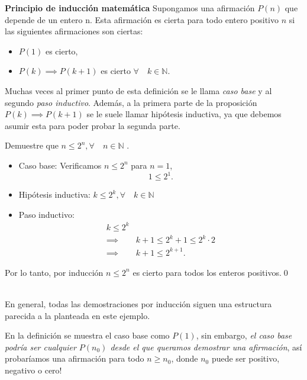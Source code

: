 \documentclass[12pt]{book}
\begin{document}
\begin{axiomenv}
    \textbf{Principio de inducción matemática}
    Supongamos una afirmación $P(n)$ que depende de un entero n. Esta afirmación es cierta para todo entero positivo $n$ si las siguientes afirmaciones son ciertas:
    \begin{itemize}
        \item $P(1)$ es cierto,
        \item $P(k)\implies P(k+1)$ es cierto $\forall \quad k \in \mathbb{N}$.
    \end{itemize}
\end{axiomenv}

Muchas veces al primer punto de esta definición se le llama \textit{caso base} y al segundo \textit{paso inductivo}. Además, a la primera parte de la proposición $P(k) \implies P(k+1)$ se le suele llamar hipótesis inductiva, ya que debemos asumir esta para poder probar la segunda parte.\\

\begin{exampleenv}
Demuestre que $n\leq2^n,\forall\quad n\in\mathbb{N}$ .\\

\begin{itemize}
    \item Caso base: Verificamos $n\leq 2 ^n$ para $n=1$,
        \[
            1\leq2^1.
        \]
    \item Hipótesis inductiva: $k\leq 2^k,\forall\quad k\in\mathbb{N}$
    \item Paso inductivo:
        \begin{align*}
            k\leq 2^k\\
            \implies& k+1\leq 2^k+1\leq 2^k\cdot2\\
            \implies& k+1\leq 2^{k+1}.
        \end{align*}
\end{itemize}

Por lo tanto, por inducción $n\leq2^n$ es cierto para todos los enteros positivos.\qed \\\\
\end{exampleenv}

En general, todas las demostraciones por inducción siguen una estructura parecida a la planteada en este ejemplo.\\

\begin{obsenv}
    En la definición se muestra el caso base como $P(1)$, sin embargo, \textit{el caso base podría ser cualquier $P(n_0)$ desde el que queramos demostrar una afirmación}, así probaríamos una afirmación para todo $n\geq n_0$, donde $n_0$ puede ser positivo, negativo o cero!
\end{obsenv}
\end{document}
